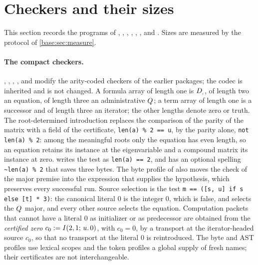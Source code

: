 \section{Checkers and their sizes}
\label{guard:sec:checkers}

This section records the programs of ,
, ,
, , ,
 and .  Sizes are measured by the
protocol of \cref{base:sec:measure}.

\paragraph{The compact checkers.}
, , ,
,  and
 modify the arity-coded checkers of the earlier
packages; the codec is inherited and is not changed.  A formula array of
length one is $D_{,}$, of length two an equation, of length three an
administrative $Q_{}$; a term array of length one is a successor and of
length three an iterator; the other lengths denote zero or truth.  The
root-determined introduction replaces the comparison of the parity of the
matrix with a field of the certificate, \texttt{len(a) \% 2 == u}, by the
parity alone, \texttt{not len(a) \% 2}: among the meaningful roots only the
equation has even length, so an equation retains its instance at the
eigenvariable and a compound matrix its instance at zero.
 writes the test as \texttt{len(a) == 2}, and
 has an optional spelling
\texttt{\textasciitilde len(a) \% 2} that saves three bytes.  The byte
profile of  also moves the check of the major premise
into the expression that supplies the hypothesis, which preserves every
successful run.  Source selection is the test
\texttt{m == ([s, u] if s else [t] * 3)}: the canonical literal $0$ is the
integer $0$, which is false, and selects the $Q_{}$ major, and every other
source selects the equation.  Computation packets that cannot have a
literal $0$ as initializer or as predecessor are obtained from the
\emph{certified zero} $c_0\mathrel{:=}I(2,1;\,u.\,0)$, with $c_0=0$, by a
transport at the iterator-headed source $c_0$, so that no transport at the
literal $0$ is reintroduced.  The byte and AST profiles use lexical scopes
and the token profiles a global supply of fresh names; their certificates
are not interchangeable.

